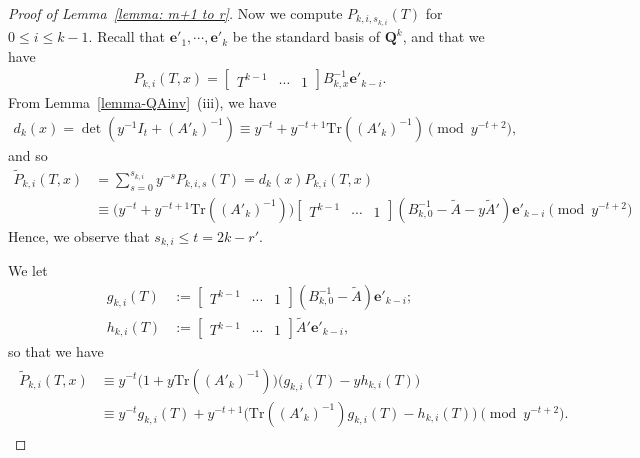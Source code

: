\documentclass[11pt]{amsart}
\theoremstyle{definition}
\numberwithin{equation}{subsection}
\theoremstyle{plain}
\theoremstyle{plain}
\theoremstyle{plain}
\theoremstyle{plain}
\theoremstyle{plain}
\theoremstyle{plain}
\theoremstyle{plain}
\theoremstyle{plain}
\theoremstyle{plain}
\theoremstyle{plain}
\theoremstyle{plain}
\theoremstyle{plain}
\theoremstyle{definition}
\theoremstyle{definition}
\theoremstyle{definition}
\theoremstyle{remark}
\renewcommand{\(}{\textup{(}}
\renewcommand{\)}{\textup{)}}
\newcommand{\Q}{\mathbf{Q}}
\newcommand{\Tr}{\mathrm{Tr}}
\begin{document}
\begin{proof}[Proof of Lemma~\ref{lemma: m+1 to r}]
Now we compute $P_{k,i,s_{k,i}}(T)$ for $0\leq i\leq k-1$. Recall that $\mathbf{e}'_1,\cdots,\mathbf{e}'_k$ be the standard basis of $\Q^k$, and that we have
    \begin{align*}
        P_{k,i}(T,x)
        =
        \begin{bmatrix}
            T^{k-1} & \cdots & 1
        \end{bmatrix}
        B_{k,x}^{-1}\mathbf{e}'_{k-i}.
    \end{align*}
From Lemma~\ref{lemma-QAinv}~(iii), we have
    \begin{align*}
        d_k(x)
       =\det(y^{-1}I_t+(A'_k)^{-1})
       \equiv
        y^{-t}+y^{-t+1}\Tr((A'_k)^{-1})
        \pmod{y^{-t+2}},
    \end{align*}
and so
    \begin{align*}
        \tilde P_{k,i}(T,x)
        &=
        \sum_{s=0}^{s_{k,i}}y^{-s} P_{k,i,s}(T)
        =d_k(x)P_{k,i}(T,x)
        \\&\equiv
        \big(y^{-t}+y^{-t+1}\Tr((A'_k)^{-1})\big)
        \begin{bmatrix}
            T^{k-1} & \cdots & 1
        \end{bmatrix}
        (B_{k,0}^{-1}-\tilde A-y\tilde A')
        \mathbf{e}'_{k-i}\pmod{y^{-t+2}}
    \end{align*}
Hence, we observe that $s_{k,i}\leq t=2k-r'$.


We let
    \begin{align*}
        g_{k,i}(T)
        &:=
        \begin{bmatrix}
            T^{k-1} & \cdots & 1
        \end{bmatrix}
        (B_{k,0}^{-1}-\tilde A)
        \mathbf{e}'_{k-i};
        \\
        h_{k,i}(T)
        &:=
        \begin{bmatrix}
            T^{k-1} & \cdots & 1
        \end{bmatrix}
        \tilde A'
        \mathbf{e}'_{k-i},
    \end{align*}
so that we have
    \begin{align}\label{eq: tilde P_k,i}
    \begin{split}
        \tilde P_{k,i}(T,x)
        &\equiv
        y^{-t}\big(1+y\Tr((A'_k)^{-1})\big)
        \big(g_{k,i}(T)-yh_{k,i}(T)\big)
        \\
        &\equiv
        y^{-t}
        g_{k,i}(T)
        +
        y^{-t+1}
        \big(
        \Tr((A'_k)^{-1})g_{k,i}(T)
        -h_{k,i}(T)
        \big)\pmod{y^{-t+2}}.
    \end{split}
    \end{align}



\end{proof}
\end{document}
